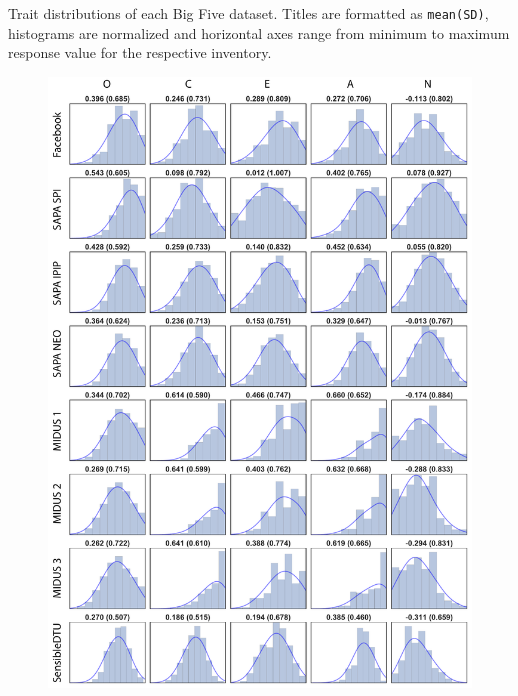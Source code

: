 Trait distributions of each Big Five dataset. Titles are formatted as \texttt{mean(SD)}, histograms are normalized and horizontal axes range from minimum to maximum response value for the respective inventory.

\begin{figure}[!ht]
	\centering
	\includegraphics[width=\textwidth]{figures/dataDistributions}
\end{figure}